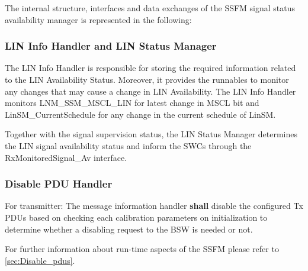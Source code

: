 {}

The internal structure, interfaces and data exchanges of the SSFM signal status availability manager is represented in the following:



\subsubsection{LIN Info Handler and LIN Status Manager}


The LIN Info Handler is responsible for storing the required information related to the LIN Availability Status. 
Moreover, it provides the runnables to monitor any changes that may cause a change in LIN Availability.
The LIN Info Handler monitors LNM_SSM_MSCL_LIN for latest change in MSCL bit and LinSM_CurrentSchedule for any change in
the current schedule of LinSM.

{     }


Together with the signal supervision status, the LIN Status Manager determines the LIN signal availability status and 
inform the SWCs through the RxMonitoredSignal_Av interface.

{    
    
    
}

\subsubsection{Disable PDU Handler}
\label{subsec:Disable_PDU}
For transmitter:
The message information handler \textbf{shall} disable the configured Tx PDUs based on checking each calibration parameters on initialization to determine whether a disabling request to the BSW is needed or not.

{  }

For further information about run-time aspects of the SSFM please refer to \ref{sec:Disable_pdus}.

